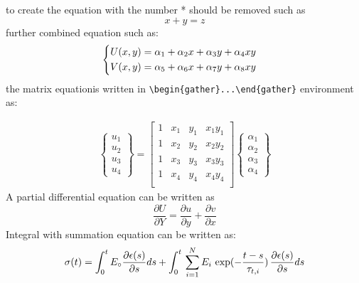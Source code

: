 to create the equation with the number * should be removed such as
\begin{equation}\label{}
	   x+y=z
\end{equation}
%
%
further combined equation such as:
\begin{equation}\label{1.2}
	\centering
	\begin{cases}
    \begin{aligned}
        U(x,y) = \alpha_1 + \alpha_2x + \alpha_3y + \alpha_4xy \\
	    V(x,y) = \alpha_5 + \alpha_6x + \alpha_7y + \alpha_8xy
    \end{aligned} 
    \end{cases}
\end{equation}
%
the matrix equationis written in \verb|\begin{gather}...\end{gather}| environment as:

\begin{gather}\label{eq3.4}
        \begin{Bmatrix}	
		u_1\\ u_2 \\u_3 \\u_4
		\end{Bmatrix}
		=
		\begin{bmatrix}
		1& x_1     & y_1 & x_1y_1 \\
		1& x_2     & y_2 & x_2y_2 \\
		1& x_3     & y_3 & x_3y_3 \\
		1& x_4     & y_4 & x_4y_4 \\
		\end{bmatrix}
		\begin{Bmatrix}
	    \alpha_1 \\ \alpha_2 \\ \alpha_3 \\ \alpha_4
	    \end{Bmatrix}
\end{gather}
%
A partial differential equation can be written as
\begin{equation}
     \frac{\partial U}{\partial Y} = \frac{\partial u}{\partial y} + \frac{\partial v}{\partial x}
\end{equation}
%
Integral with summation equation can be written as:
\begin{equation}
     \sigma (t) = \int^t_0 E_\circ \frac{\partial\epsilon (s)}{\partial s} ds + \int^t_0 \, \sum^N_{i=1}E_i \, \exp (-\frac{t-s}{\tau_{t,i}})  \, \frac{\partial\epsilon (s)}{\partial s} ds\\
\end{equation}